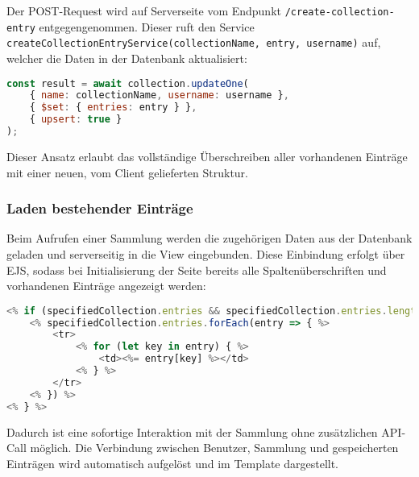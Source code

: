 Der POST-Request wird auf Serverseite vom Endpunkt \texttt{/create-collection-entry} entgegengenommen.
Dieser ruft den Service \texttt{createCollectionEntryService(collectionName, entry, username)} auf, welcher die Daten in der Datenbank aktualisiert:

\begin{lstlisting}[language=JavaScript, caption=Service-Logik zum Überschreiben von Einträgen]
const result = await collection.updateOne(
    { name: collectionName, username: username },
    { $set: { entries: entry } },
    { upsert: true }
);
\end{lstlisting}

Dieser Ansatz erlaubt das vollständige Überschreiben aller vorhandenen Einträge mit einer neuen, vom Client gelieferten Struktur.

\subsubsection{Laden bestehender Einträge}

Beim Aufrufen einer Sammlung werden die zugehörigen Daten aus der Datenbank geladen und serverseitig in die View eingebunden.
Diese Einbindung erfolgt über EJS, sodass bei Initialisierung der Seite bereits alle Spaltenüberschriften und vorhandenen Einträge angezeigt werden:

\begin{lstlisting}[language=JavaScript, caption=Darstellung in collections.ejs]
<% if (specifiedCollection.entries && specifiedCollection.entries.length > 0) { %>
    <% specifiedCollection.entries.forEach(entry => { %>
        <tr>
            <% for (let key in entry) { %>
                <td><%= entry[key] %></td>
            <% } %>
        </tr>
    <% }) %>
<% } %>
\end{lstlisting}

Dadurch ist eine sofortige Interaktion mit der Sammlung ohne zusätzlichen API-Call möglich.
Die Verbindung zwischen Benutzer, Sammlung und gespeicherten Einträgen wird automatisch aufgelöst und im Template dargestellt.
